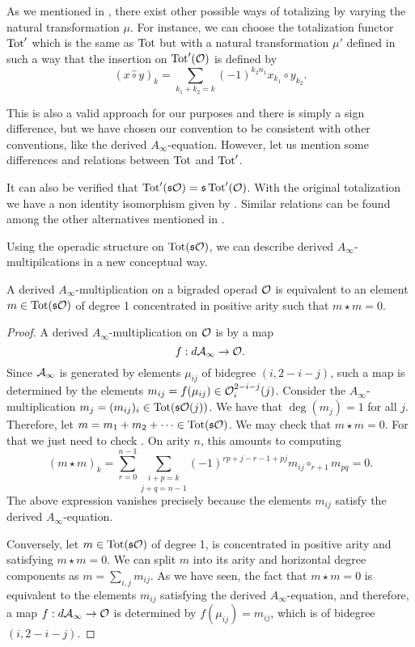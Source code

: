 \documentclass[Thesis.tex]{subfiles}
\begin{document}
\begin{remark}\label{othermu}


As we mentioned in , there exist other possible ways of totalizing by varying the natural transformation $\mu$. For instance, we can choose the totalization functor $\operatorname{Tot}'$ which is the same as $\operatorname{Tot}$ but with a natural transformation $\mu'$ defined in such a way that the insertion on $\operatorname{Tot}'({\mathcal O})$ is defined by \[(x\hat{\circ}y)_k=\sum_{k_1+k_2=k}(-1)^{k_2n_1}x_{k_1}\circ y_{k_2}.\] 

This is also a valid approach for our purposes and there is simply a sign difference, but we have chosen our convention to be consistent with other conventions, like the derived $A_\infty$-equation. However, let us mention some differences and relations between $\operatorname{Tot}$ and $\operatorname{Tot}'$. 

It can also be verified that $\operatorname{Tot}'(\mathfrak{s}{\mathcal O})=\mathfrak{s} \operatorname{Tot}'({\mathcal O})$. With the original totalization we have a non identity isomorphism given by . Similar relations can be found among the other alternatives mentioned in . %



\end{remark}


Using the operadic structure on $\operatorname{Tot}(\mathfrak{s}{\mathcal O})$, we can describe derived $A_\infty$-multipilcations in a new conceptual way.

\begin{lem}\label{mstar}
A derived $A_\infty$-multiplication on a bigraded operad ${\mathcal O}$ is equivalent to an element $m\in\operatorname{Tot}(\mathfrak{s}{\mathcal O})$ of degree 1 concentrated in positive arity such that $m\star m = 0$. 
\end{lem}
\begin{proof}
A derived $A_\infty$-multiplication on ${\mathcal O}$ is by  a map 
\[f:d\mathcal{A}_\infty\to{\mathcal O}.\]
Since $\mathcal{A}_\infty$ is generated by elements $\mu_{ij}$ of bidegree $(i,2-i-j)$, such a map is determined by the elements $m_{ij}=f(\mu_{ij})\in{\mathcal O}^{2-i-j}_i(j)$. Consider the $A_\infty$-multiplication $m_j = (m_{ij})_i\in\operatorname{Tot}(\mathfrak{s}{\mathcal O}(j))$. We have that $\deg(m_j)=1$ for all $j$. Therefore, let $m=m_1+m_2+\cdots\in\operatorname{Tot}(\mathfrak{s}{\mathcal O})$. We may check that $m\star m=0$. For that we just need to check . On arity $n$, this amounts to computing
\[(m\star m)_k = \sum_{r=0}^{n-1}\underset{j+q=n-1}{\sum_{i+p=k}}(-1)^{rp+j-r-1+ pj}m_{ij}\circ_{r+1}m_{pq}=0.\]
The above expression vanishes precisely because the elements $m_{ij}$ satisfy the derived $A_\infty$-equation.

Conversely, let $m\in\operatorname{Tot}(\mathfrak{s}{\mathcal O})$ of degree 1, is concentrated in positive arity and satisfying $m\star m=0$. We can split $m$ into its arity and horizontal degree components as $m=\sum_{i,j}m_{ij}$. As we have seen, the fact that $m\star m=0$ is equivalent to the elements $m_{ij}$ satisfying the derived $A_\infty$-equation, and therefore, a map $f:d\mathcal{A}_\infty\to{\mathcal O}$ is determined by $f(\mu_{ij})=m_{ij}$, which is of bidegree $(i,2-i-j)$. 
\end{proof}
\end{document}
